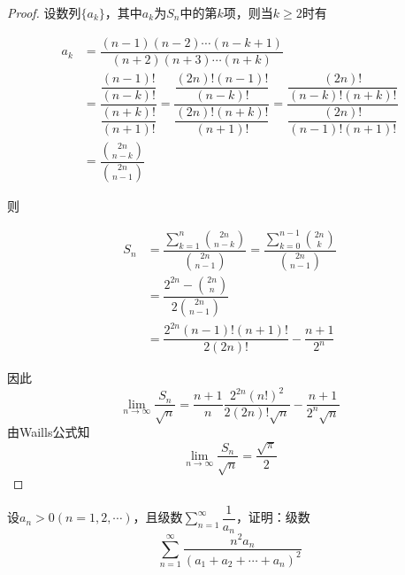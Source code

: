 \begin{proof}
    
    设数列$\{a_k\}$，其中$a_k$为$S_n$中的第$k$项，则当$k \geq 2$时有

    \begin{align*}
        a_k &= \dfrac{(n-1)(n-2)\cdots(n-k+1)}{(n+2)(n+3)\cdots(n+k)} \\
        & = \dfrac{\dfrac{(n-1)!}{(n-k)!}}{\dfrac{(n+k)!}{(n+1)!}} = \dfrac{\dfrac{(2n)!(n-1)!}{(n-k)!}}{\dfrac{(2n)!(n+k)!}{(n+1)!}} = \dfrac{\dfrac{(2n)!}{(n-k)!(n+k)!}}{\dfrac{(2n)!}{(n-1)!(n+1)!}} \\
        & = \dfrac{\binom{2n}{n-k}}{\binom{2n}{n-1}}
    \end{align*}

    则
    
    \begin{align*}
        S_n &= \dfrac{\sum\limits_{k=1}^{n}{\binom{2n}{n-k}}}{\binom{2n}{n-1}} = \dfrac{\sum\limits_{k=0}^{n-1}{\binom{2n}{k}}}{\binom{2n}{n-1}} \\
        & = \dfrac{2^{2n} - \binom{2n}{n}}{2\binom{2n}{n-1}} \\
        & = \dfrac{2^{2n}(n-1)!(n+1)!}{2(2n)!} - \dfrac{n+1}{2^n}  
    \end{align*}

    因此
        $$\lim\limits_{n\to\infty}{\dfrac{S_n}{\sqrt{n}}} = \dfrac{n+1}{n} \dfrac{2^{2n}(n!)^2}{2(2n)!\sqrt{n}} - \dfrac{n+1}{2^n\sqrt{n}}$$
    由\textup{Waills}公式知
        $$\lim\limits_{n\to\infty}{\dfrac{S_n}{\sqrt{n}}} = \dfrac{\sqrt{\pi}}{2}$$

\end{proof}

\begin{proposition}
    
    设$a_n > 0(n = 1,2,\cdots)$，且级数$\sum\limits_{n=1}^{\infty}{\dfrac{1}{a_n}}$，证明：级数
    $$ \sum\limits_{n=1}^{\infty}{\dfrac{n^2a_n}{(a_1 + a_2+ \cdots + a_n)^2}} $$

\end{proposition}

